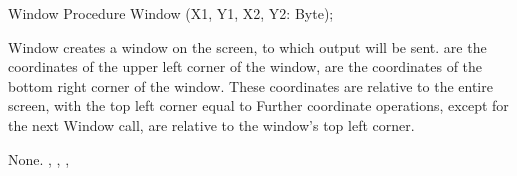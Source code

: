  \html{}
\begin{procedure}{Window}
\Declaration
Procedure Window (X1, Y1, X2, Y2: Byte);

\Description
 Window creates a window on the screen, to which output will be sent.
 are the coordinates of the upper left corner of the window,
 are the coordinates of the bottom right corner of the window.
These coordinates are relative to the entire screen, with the top left
corner equal to 
Further coordinate operations, except for the next Window call,
are relative to the window's top left corner.

\Errors
None.
\SeeAlso
{}, , , 
\end{procedure}
\html{}
